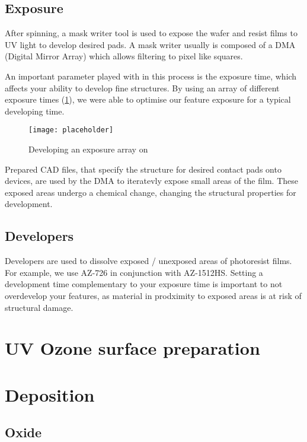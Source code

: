 \documentclass[../Matt_Gebert_Honours_Thesis.tex]{subfiles}
\begin{document}
	\subsection{Exposure}\label{sec:exposure}
		After spinning, a mask writer tool is used to expose the wafer and resist films to UV light to develop desired pads. A mask writer usually is composed of a DMA (Digital Mirror Array) which allows filtering to pixel like squares. %
		
		An important parameter played with in this process is the exposure time, which affects your ability to develop fine structures. By using an array of different exposure times (\cref{fig:exposure_array}), we were able to optimise our feature exposure for a typical developing time.
		
	\begin{figure}[H]
		\centering
		\texttt{[image: placeholder]}
		\caption{Developing an exposure array on \silicondioxide}\label{fig:exposure_array}
	\end{figure}
	
	Prepared CAD files, that specify the structure for desired contact pads onto devices, are used by the DMA to iteratevly expose small areas of the film. These exposed areas undergo a chemical change, changing the structural properties for development.
	
	\subsection{Developers}\label{sec:developer}
	Developers are used to dissolve exposed / unexposed areas of photoresist films. For example, we use AZ-726 in conjunction with AZ-1512HS. Setting a development time complementary to your exposure time is important to not overdevelop your features, as material in prodximity to exposed areas is at risk of structural damage.
	
	
	\section{UV Ozone surface preparation}\label{sec:uv_ozone}
	
	\section{Deposition}\label{sec:deposition}
	
	\subsection{Oxide}
	
\end{document}
